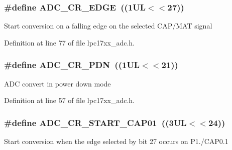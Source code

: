 \hypertarget{group___a_d_c___private___macros_ga1d05d43234dd2d1489841dff0012225e}{
\subsubsection[{\-A\-D\-C\-\_\-\-C\-R\-\_\-\-E\-D\-G\-E}]{\setlength{\rightskip}{0pt plus 5cm}\#define {\bf \-A\-D\-C\-\_\-\-C\-R\-\_\-\-E\-D\-G\-E}~((1\-U\-L$<$$<$27))}}\label{group___a_d_c___private___macros_ga1d05d43234dd2d1489841dff0012225e}
\-Start conversion on a falling edge on the selected \-C\-A\-P/\-M\-A\-T signal 

\-Definition at line 77 of file lpc17xx\-\_\-adc.\-h.

\hypertarget{group___a_d_c___private___macros_ga7474e4ab5695434acbfe8a5fcad35ef0}{
\subsubsection[{\-A\-D\-C\-\_\-\-C\-R\-\_\-\-P\-D\-N}]{\setlength{\rightskip}{0pt plus 5cm}\#define {\bf \-A\-D\-C\-\_\-\-C\-R\-\_\-\-P\-D\-N}~((1\-U\-L$<$$<$21))}}\label{group___a_d_c___private___macros_ga7474e4ab5695434acbfe8a5fcad35ef0}
\-A\-D\-C convert in power down mode 

\-Definition at line 57 of file lpc17xx\-\_\-adc.\-h.

\hypertarget{group___a_d_c___private___macros_ga4e02749175edb9417c4a7961b2d4e4c9}{
\subsubsection[{\-A\-D\-C\-\_\-\-C\-R\-\_\-\-S\-T\-A\-R\-T\-\_\-\-C\-A\-P01}]{\setlength{\rightskip}{0pt plus 5cm}\#define {\bf \-A\-D\-C\-\_\-\-C\-R\-\_\-\-S\-T\-A\-R\-T\-\_\-\-C\-A\-P01}~((3\-U\-L$<$$<$24))}}\label{group___a_d_c___private___macros_ga4e02749175edb9417c4a7961b2d4e4c9}
\-Start conversion when the edge selected by bit 27 occurs on \-P1./\-C\-A\-P0.1 

